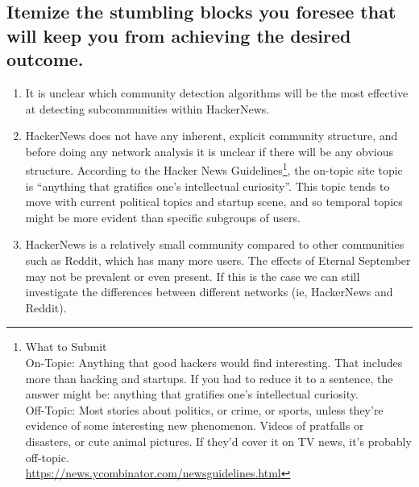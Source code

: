 \documentclass{tufte-handout}
\begin{document}
\subsection{Itemize the stumbling blocks you foresee that will keep you from achieving the desired outcome.}

\begin{enumerate}
\item It is unclear which community detection algorithms will be the most effective at detecting subcommunities within HackerNews.
\item HackerNews does not have any inherent, explicit community structure, and before doing any network analysis it is unclear if there will be any obvious structure. According to the Hacker News Guidelines\footnote{
What to Submit\\
On-Topic: Anything that good hackers would find interesting. That includes more than hacking and startups. If you had to reduce it to a sentence, the answer might be: anything that gratifies one's intellectual curiosity.\\
Off-Topic: Most stories about politics, or crime, or sports, unless they're evidence of some interesting new phenomenon. Videos of pratfalls or disasters, or cute animal pictures. If they'd cover it on TV news, it's probably off-topic.\\ \noindent \url{https://news.ycombinator.com/newsguidelines.html}}, the on-topic site topic is ``anything that gratifies one's intellectual curiosity''. This topic tends to move with current political topics and startup scene, and so temporal topics might be more evident than specific subgroups of users.
\item HackerNews is a relatively small community compared to other communities such as Reddit, which has many more users. The effects of Eternal September may not be prevalent or even present. If this is the case we can still investigate the differences between different networks (ie, HackerNews and Reddit).
\end{enumerate}
\end{document}
